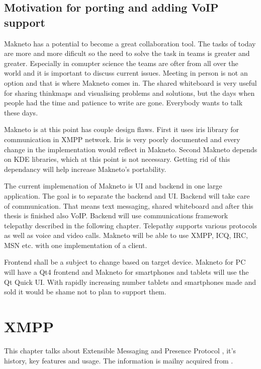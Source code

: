 \section{Motivation for porting and adding VoIP support}
Makneto has a potential to become a great collaboration tool. The tasks of today are more and more dificult so the need to solve the task in teams is greater and greater. Especially in comupter science the teams are ofter from all over the world and it is important to discuss current issues. Meeting in person is not an option and that is where Makneto comes in. The shared whiteboard is very useful for sharing thinkmaps and visualising problems and solutions, but the days when people had the time and patience to write are gone. Everybody wants to talk these days.  

Makneto is at this point has couple design flaws. First it uses iris library for communication in XMPP network. Iris is very poorly documented and every change in the implementation would reflect in Makneto. Second Makneto depends on KDE libraries, which at this point is not necessary. Getting rid of this dependancy will help increase Makneto's portability. 

The current implemenation of Makneto is UI and backend in one large application. The goal is to separate the backend and UI. Backend will take care of communication. That means text messaging, shared whiteboard and after this thesis is finished also VoIP. Backend will use communications framework telepathy described in the following chapter. Telepathy supports various protocols as well as voice and video calls. Makneto will be able to use XMPP, ICQ, IRC, MSN etc. with one implementation of a client.

Frontend shall be a subject to change based on target device. Makneto for PC will have a Qt4 frontend and Makneto for smartphones and tablets will use the Qt Quick UI. With rapidly increasing number tablets and smartphones made and sold it would be shame not to plan to support them.  




\chapter{XMPP}\label{chapter:xmpp}
This chapter talks about Extensible Messaging and Presence Protocol \cite{xmpp}, it's history, key features and usage. The information is mailny acquired from \cite{xmppBook,xmppCoreRFC,xmppIMRFC}.

